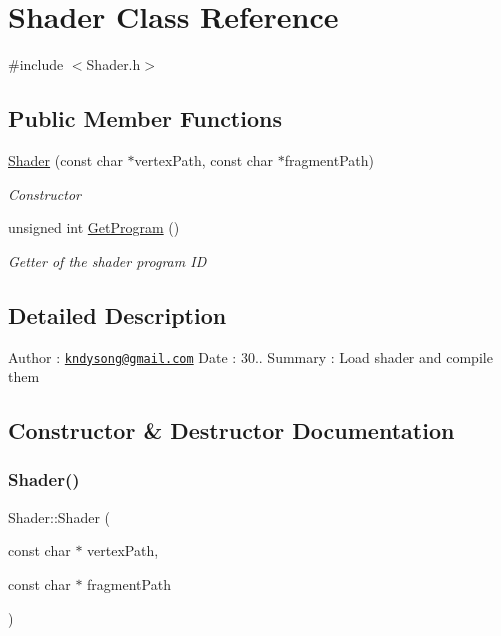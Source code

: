 \hypertarget{class_shader}{}\section{Shader Class Reference}
\label{class_shader}


{\ttfamily \#include $<$Shader.\+h$>$}

\subsection*{Public Member Functions}
\begin{DoxyCompactItemize}
\item 
\mbox{\hyperlink{class_shader_a3e135bbf914b087a939114d79c10d283}{Shader}} (const char $\ast$vertex\+Path, const char $\ast$fragment\+Path)
\begin{DoxyCompactList}\small\item\em Constructor \end{DoxyCompactList}\item 
unsigned int \mbox{\hyperlink{class_shader_a2c8b39f95cb2dd13b0309960d1d835d7}{Get\+Program}} ()
\begin{DoxyCompactList}\small\item\em Getter of the shader program ID \end{DoxyCompactList}\end{DoxyCompactItemize}


\subsection{Detailed Description}
Author \+: \href{mailto:kndysong@gmail.com}{\tt kndysong@gmail.\+com} Date \+: 30.. Summary \+: Load shader and compile them 

\subsection{Constructor \& Destructor Documentation}
\mbox{\label{class_shader_a3e135bbf914b087a939114d79c10d283}} 
\subsubsection{\texorpdfstring{Shader()}{Shader()}}
{\footnotesize\ttfamily Shader\+::\+Shader (\begin{DoxyParamCaption}\item[{const char $\ast$}]{vertex\+Path,  }\item[{const char $\ast$}]{fragment\+Path }\end{DoxyParamCaption})}



